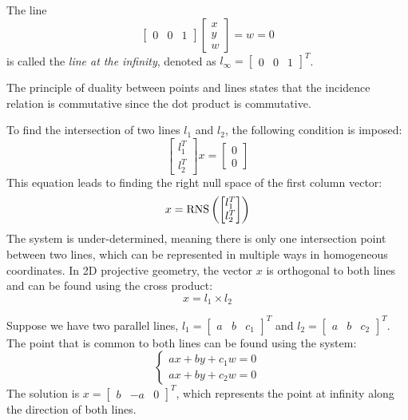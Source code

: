\documentclass[12pt, a4paper]{report}
\begin{document}
    \begin{definition}
        The line 
        \[\begin{bmatrix} 0 & 0 & 1 \end{bmatrix} \begin{bmatrix} x \\ y \\ w \end{bmatrix}=w=0\] 
        is called the \emph{line at the infinity}, denoted as $l_{\infty}={\begin{bmatrix} 0 & 0 & 1 \end{bmatrix}}^T$. 
    \end{definition}
    The principle of duality between points and lines states that the incidence relation is commutative since the dot product is commutative.

    To find the intersection of two lines $l_1$ and $l_2$, the following condition is imposed:
    \[\begin{bmatrix} l_1^T \\ l_2^T \end{bmatrix} x = \begin{bmatrix} 0 \\ 0 \end{bmatrix}\]
    This equation leads to finding the right null space of the first column vector:
    \[x=\textnormal{RNS}\left(\begin{bmatrix}l_1^T \\ l_2^T \end{bmatrix} \right)\]
    The system is under-determined, meaning there is only one intersection point between two lines, which can be represented in multiple ways in homogeneous coordinates.
    In 2D projective geometry, the vector $x$ is orthogonal to both lines and can be found using the cross product:
    \[x=l_1 \times l_2\]
    \begin{example}
        Suppose we have two parallel lines, $l_1={\begin{bmatrix} a & b & c_1 \end{bmatrix}}^T$ and $l_2={\begin{bmatrix} a & b & c_2 \end{bmatrix}}^T$. 
        The point that is common to both lines can be found using the system:
        \[
            \begin{cases}
                ax+by+c_1w=0 \\
                ax+by+c_2w=0
            \end{cases}
        \]
        The solution is ${x=\begin{bmatrix} b & -a & 0 \end{bmatrix}}^T$, which represents the point at infinity along the direction of both lines.
    \end{example}
\end{document}

